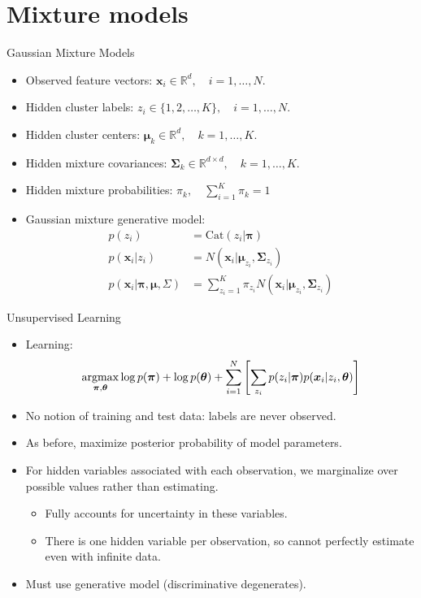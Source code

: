 \documentclass[10pt,mathserif]{beamer}
\begin{document}
\section{Mixture models}
\begin{frame}{Gaussian Mixture Models}
\begin{itemize}
    \item Observed feature vectors: $\bm{x}_i\in\mathbb{R}^d, \quad i=1,\ldots,N$.
    \item Hidden cluster labels: $z_i\in\{1,2,\ldots,K\}, \quad i=1,\ldots,N$.
    \item Hidden cluster centers: $\bm{\mu}_k\in\mathbb{R}^d, \quad k=1,\ldots,K$. 
    \item Hidden mixture covariances: $\bm{\Sigma}_k\in\mathbb{R}^{d \times d}, \quad k=1,\ldots,K$.
    \item Hidden mixture probabilities: $\pi_k, \quad \sum_{i=1}^K \pi_k = 1$
    \item Gaussian mixture generative model: 
    \begin{equation*}
        \begin{split}
            p(z_i) & = \text{Cat}(z_i|\bm{\pi}) \\
            p(\bm{x}_i | z_i) & = N(\bm{x}_i | \bm{\mu}_{z_i}, \bm{\Sigma}_{z_i} )\\
            p(\bm{x}_i|\bm{\pi},\bm{\mu},\Sigma) & = \sum_{z_i=1}^K \pi_{z_i} N(\bm{x}_i | \bm{\mu}_{z_i}, \bm{\Sigma}_{z_i})
        \end{split}
    \end{equation*}
\end{itemize}
\end{frame}

\begin{frame}{Unsupervised Learning}
\begin{itemize}
    \item Learning: 
    \begin{equation*}
        \mathop{\rm argmax}_{\bm{\pi},\bm{\theta}} \log p(\bm{\pi}) + \log p(\bm{\theta}) + \sum_{i=1}^N \left[\sum_{z_i}p(z_i|\bm{\pi})p(\bm{x}_i|z_i,\bm{\theta})\right]
    \end{equation*}
    \item No notion of training and test data: labels are never observed.
    \item As before, maximize posterior probability of model parameters.
    \item For hidden variables associated with each observation, we marginalize over possible values rather than estimating.
    \begin{itemize}
        \item Fully accounts for uncertainty in these variables.
        \item There is one hidden variable per observation, so cannot perfectly estimate even with infinite data.
    \end{itemize}
    \item Must use generative model (discriminative degenerates).
\end{itemize}
\end{frame}
\end{document}
